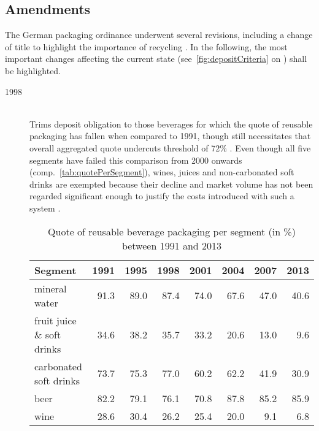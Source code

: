 \subsection{Amendments}
The German packaging ordinance underwent several revisions, including a change of title to highlight the importance of recycling \cite{verpackV1998}. In the following, the most important changes affecting the current state (see~\autoref{fig:depositCriteria} on ) shall be highlighted.

\begin{description}
	\item[1998]
	\hfill \\
	Trims deposit obligation to those beverages for which the quote of reusable packaging has fallen when compared to 1991, though still necessitates that overall aggregated quote undercuts threshold of 72\% \cite[pp.~142]{Flanderka1999}. Even though all five segments have failed this comparison from 2000 onwards (comp.~\autoref{tab:quotePerSegment}), wines, juices and non-carbonated soft drinks are exempted because their decline and market volume has not been regarded significant enough to justify the costs introduced with such a system  \cite[pp.~6,~9]{Hartlep2011Recycling}. 


\begin{table}[hbt]
	\centering
	\begin{tabular}{l|r|r|r|r|r|r|r}
    Segment & 1991 & 1995 & 1998 & 2001 & 2004 & 2007 & 2013 \\
    \hline
    mineral water & 91.3 & 89.0 & 87.4 & 74.0 & 67.6 & 47.0 & 40.6 \\
    fruit juice \& soft drinks & 34.6 & 38.2 & 35.7 & 33.2 & 20.6 & 13.0 & 9.6 \\
    carbonated soft drinks & 73.7 & 75.3 & 77.0 & 60.2 & 62.2 & 41.9 & 30.9 \\
    beer & 82.2 & 79.1 & 76.1 & 70.8 & 87.8 & 85.2 & 85.9 \\
    wine & 28.6 & 30.4 & 26.2 & 25.4 & 20.0 & 9.1 & 6.8
  	\end{tabular}
  	\caption[Quote of reusable beverage packaging per segment (in \%) between 1991 and 2013]{Quote of reusable beverage packaging per segment (in \%) between 1991 and 2013 \cite{BMU2015}}
  	\label{tab:quotePerSegment}
\end{table}


\end{description}
